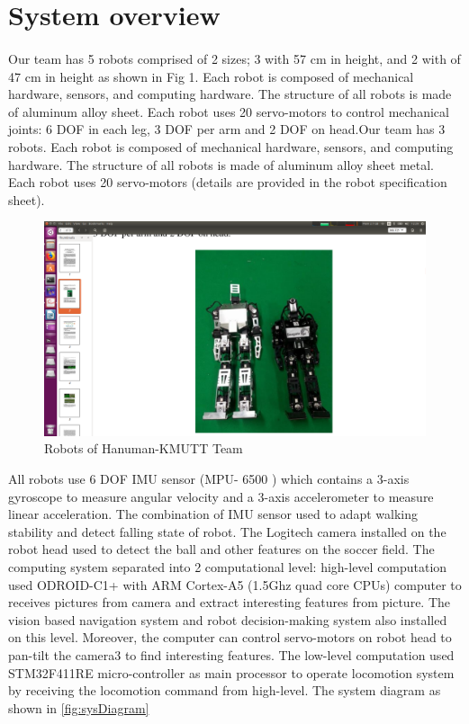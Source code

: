 \section{System overview}
\paragraph{}
Our team has 5 robots comprised of 2 sizes; 3 with 57 cm in height, and 2 with of 47 cm in height as shown in Fig 1. Each robot is composed of mechanical hardware, sensors, and computing hardware. The structure of all robots is made of aluminum alloy sheet. Each robot uses 20 servo-motors to control mechanical joints: 6 DOF in each leg, 3 DOF per arm and 2 DOF on head.Our team has 3 robots. Each robot is composed of mechanical hardware, sensors, and computing hardware. The structure of all robots is made of aluminum alloy sheet metal. Each robot uses 20 servo-motors (details are provided in the robot specification sheet).
\begin{figure}[H]
	\centering
	\includegraphics[width=\textwidth,trim={15cm 0cm 5cm 5cm},clip]{image/humanoid.png}
	\caption{Robots of Hanuman-KMUTT Team}
	\label{fig:humanoid}
\end{figure}
All robots use 6 DOF IMU sensor (MPU- 6500 ) which contains a 3-axis gyroscope to measure angular velocity and a 3-axis accelerometer to measure linear acceleration. The combination of IMU sensor used to adapt walking stability and detect falling state of robot. The Logitech camera installed on the robot head used to detect the ball and other features on the soccer field. The computing system separated into 2 computational level: high-level computation used ODROID-C1+ with ARM Cortex-A5 (1.5Ghz quad core CPUs) computer to receives pictures from camera and extract interesting features from picture. The vision based navigation system and robot decision-making system also installed on this level. Moreover, the computer can control servo-motors on robot head to pan-tilt the camera3 to find interesting features. The low-level computation used STM32F411RE micro-controller as main processor to operate locomotion system by receiving the locomotion command from high-level. The system diagram as shown in \ref{fig:sysDiagram}
